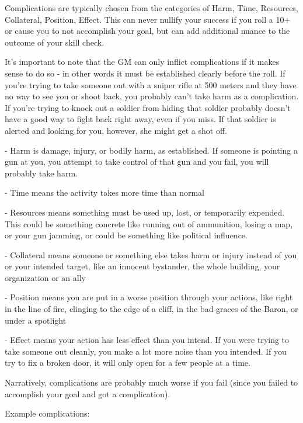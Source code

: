 Complications are typically chosen from the categories of Harm, Time, Resources, Collateral,
Position, Effect. This can never nullify your success if you roll a 10+ or cause you to not
accomplish your goal, but can add additional nuance to the outcome of your skill check.


It’s important to note that the GM can only inflict complications if it makes sense to do so - in
other words it must be established clearly before the roll. If you’re trying to take someone out
with a sniper rifle at 500 meters and they have no way to see you or shoot back, you probably
can’t take harm as a complication. If you’re trying to knock out a soldier from hiding that soldier
probably doesn’t have a good way to fight back right away, even if you miss. If that soldier is
alerted and looking for you, however, she might get a shot off.


    -    Harm is damage, injury, or bodily harm, as established. If someone is pointing a gun at
         you, you attempt to take control of that gun and you fail, you will probably take harm.





     -   Time means the activity takes more time than normal

     -   Resources means something must be used up, lost, or temporarily expended. This could
         be something concrete like running out of ammunition, losing a map, or your gun
         jamming, or could be something like political influence.

     -   Collateral means someone or something else takes harm or injury instead of you or your
         intended target, like an innocent bystander, the whole building, your organization or an
         ally

     -   Position means you are put in a worse position through your actions, like right in the line
         of fire, clinging to the edge of a cliff, in the bad graces of the Baron, or under a spotlight

     -   Effect means your action has less effect than you intend. If you were trying to take
         someone out cleanly, you make a lot more noise than you intended. If you try to fix a
         broken door, it will only open for a few people at a time.


Narratively, complications are probably much worse if you fail (since you failed to accomplish
your goal and got a complication).


Example complications:

